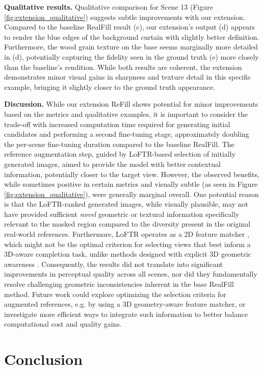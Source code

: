 \documentclass{article}
\begin{document}
\textbf{Qualitative results.}
Qualitative comparison for Scene 13 (Figure \ref{fig:extension_qualitative}) suggests subtle improvements with our extension. Compared to the baseline RealFill result (c), our extension's output (d) appears to render the blue edges of the background curtain with slightly better definition. Furthermore, the wood grain texture on the base seems marginally more detailed in (d), potentially capturing the fidelity seen in the ground truth (e) more closely than the baseline's rendition. While both results are coherent, the extension demonstrates minor visual gains in sharpness and texture detail in this specific example, bringing it slightly closer to the ground truth appearance.

\textbf{Discussion.}
While our extension ReFill shows potential for minor improvements based on the metrics and qualitative examples, it is important to consider the trade-off with increased computation time required for generating initial candidates and performing a second fine-tuning stage, approximately doubling the per-scene fine-tuning duration compared to the baseline RealFill. The reference augmentation step, guided by LoFTR-based selection of initially generated images, aimed to provide the model with better contextual information, potentially closer to the target view. However, the observed benefits, while sometimes positive in certain metrics and visually subtle (as seen in Figure \ref{fig:extension_qualitative}), were generally marginal overall. One potential reason is that the LoFTR-ranked generated images, while visually plausible, may not have provided sufficient \emph{novel} geometric or textural information specifically relevant to the masked region compared to the diversity present in the original real-world references. Furthermore, LoFTR operates as a 2D feature matcher \cite{sun2021loftr}, which might not be the optimal criterion for selecting views that best inform a 3D-aware completion task, unlike methods designed with explicit 3D geometric awareness \cite{wang2024dust3r}. Consequently, the results did not translate into significant improvements in perceptual quality across all scenes, nor did they fundamentally resolve challenging geometric inconsistencies inherent in the base RealFill method. Future work could explore optimizing the selection criteria for augmented references, e.g. by using a 3D geometry-aware feature matcher, or investigate more efficient ways to integrate such information to better balance computational cost and quality gains.

\section{Conclusion}
\label{sec:conclusion}
\end{document}

